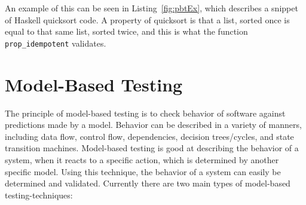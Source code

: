 An example of this can be seen in Listing~\ref{fig:pbtEx}, which describes a snippet of Haskell quicksort code. A property of quicksort is that a list, sorted once is equal to that same list, sorted twice, and this is what the function \lstinline{prop_idempotent} validates.

\section{Model-Based Testing}

The principle of model-based testing is to check behavior of software against predictions made by a model. Behavior can be described in a variety of manners, including data flow, control flow, dependencies, decision trees/cycles, and state transition machines. Model-based testing is good at describing the behavior of a system, when it reacts to a specific action, which is determined by another specific model. Using this technique, the behavior of a system can easily be determined and validated. Currently there are two main types of model-based testing-techniques:

